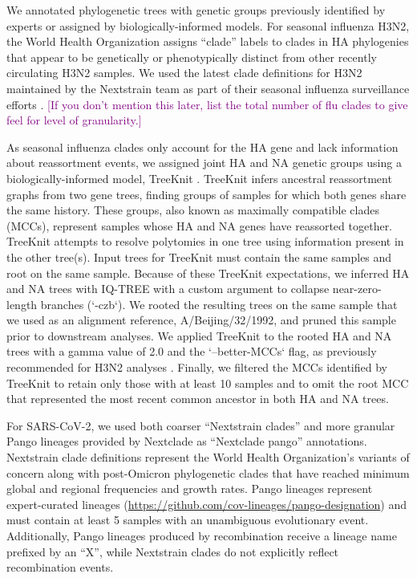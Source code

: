 \documentclass[10pt,letterpaper]{article}
\def\tbc#1{\textcolor{purple}{[#1]}}
\begin{document}
We annotated phylogenetic trees with genetic groups previously identified by experts or assigned by biologically-informed models.
For seasonal influenza H3N2, the World Health Organization assigns ``clade'' labels to clades in HA phylogenies that appear to be genetically or phenotypically distinct from other recently circulating H3N2 samples.
We used the latest clade definitions for H3N2 maintained by the Nextstrain team as part of their seasonal influenza surveillance efforts \cite{Neher2015}.
\tbc{If you don't mention this later, list the total number of flu clades to give feel for level of granularity.}

As seasonal influenza clades only account for the HA gene and lack information about reassortment events, we assigned joint HA and NA genetic groups using a biologically-informed model, TreeKnit \cite{Barrat-Charlaix2022}.
TreeKnit infers ancestral reassortment graphs from two gene trees, finding groups of samples for which both genes share the same history.
These groups, also known as maximally compatible clades (MCCs), represent samples whose HA and NA genes have reassorted together.
TreeKnit attempts to resolve polytomies in one tree using information present in the other tree(s).
Input trees for TreeKnit must contain the same samples and root on the same sample.
Because of these TreeKnit expectations, we inferred HA and NA trees with IQ-TREE with a custom argument to collapse near-zero-length branches (`-czb`).
We rooted the resulting trees on the same sample that we used as an alignment reference, A/Beijing/32/1992, and pruned this sample prior to downstream analyses.
We applied TreeKnit to the rooted HA and NA trees with a gamma value of 2.0 and the `--better-MCCs` flag, as previously recommended for H3N2 analyses \cite{Barrat-Charlaix2022}.
Finally, we filtered the MCCs identified by TreeKnit to retain only those with at least 10 samples and to omit the root MCC that represented the most recent common ancestor in both HA and NA trees.

For SARS-CoV-2, we used both coarser ``Nextstrain clades'' \cite{Hodcroft2020,Bedford2021,Roemer2022} and more granular Pango lineages \cite{OToole2021} provided by Nextclade as ``Nextclade pango'' annotations.
Nextstrain clade definitions represent the World Health Organization's variants of concern along with post-Omicron phylogenetic clades that have reached minimum global and regional frequencies and growth rates.
Pango lineages represent expert-curated lineages (\href{https://github.com/cov-lineages/pango-designation}{https://github.com/cov-lineages/pango-designation}) and must contain at least 5 samples with an unambiguous evolutionary event.
Additionally, Pango lineages produced by recombination receive a lineage name prefixed by an ``X'', while Nextstrain clades do not explicitly reflect recombination events.
\end{document}
